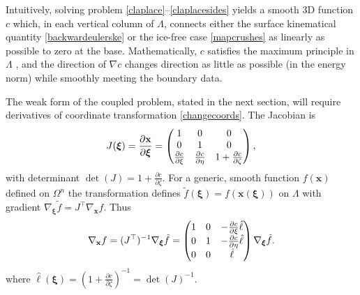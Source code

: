 \documentclass[letterpaper,final,12pt,reqno]{amsart}
\newcommand{\grad}{\nabla}
\newcommand{\bx}{\mathbf{x}}
\newcommand{\bxi}{\bm{\xi}}
\begin{document}
Intuitively, solving problem \eqref{claplace}--\eqref{claplacesides} yields a smooth 3D function $c$ which, in each vertical column of $\Lambda$, connects either the surface kinematical quantity \eqref{backwardeulerske} or the ice-free case \eqref{mapcrushes} as linearly as possible to zero at the base.  Mathematically, $c$ satisfies the maximum principle in $\Lambda$ \cite{Evans2010}, and the direction of $\grad c$ changes direction as little as possible (in the energy norm) while smoothly meeting the boundary data.

The weak form of the coupled problem, stated in the next section, will require derivatives of coordinate transformation \eqref{changecoords}.  The Jacobian is
\begin{equation}
J(\bxi) = \frac{\partial \bx}{\partial \bm{\xi}} = \begin{pmatrix} 1 & 0 & 0 \\ \strut 0 & 1 & 0 \\ \strut \frac{\partial c}{\partial \xi} & \frac{\partial c}{\partial \eta} & 1+\frac{\partial c}{\partial \zeta} \end{pmatrix}, \label{changejac}
\end{equation}
with determinant $\det(J) = 1+\frac{\partial c}{\partial \zeta}$.  For a generic, smooth function $f(\bx)$ defined on $\Omega^n$ the transformation defines $\tilde f(\bxi) = f(\bx(\bxi))$ on $\Lambda$ with gradient $\grad_{\bxi} \tilde f = J^\top \grad_{\bx} f$.  Thus
\begin{equation}
\grad_{\bx} f = (J^\top)^{-1} \grad_{\bxi} \tilde f = \begin{pmatrix} \strut 1 & 0 & - \frac{\partial c}{\partial \xi} \hat\ell \\ \strut 0 & 1 & -\frac{\partial c}{\partial \eta} \hat\ell \\ \strut 0 & 0 & \hat\ell \end{pmatrix} \grad_{\bxi} \tilde f. \label{changegrad}
\end{equation}
where $\hat\ell(\bxi) = \left(1+\frac{\partial c}{\partial \zeta}\right)^{-1}=\det(J)^{-1}$.
\end{document}
